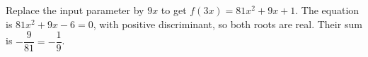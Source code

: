 Replace the input parameter by $9x$ to get $f(3x)=81x^2+9x+1$. The equation is $81x^2+9x-6=0$, with positive discriminant, so both roots are real. Their sum is $-\dfrac{9}{81}=\boxed{-\dfrac{1}{9}}$.
